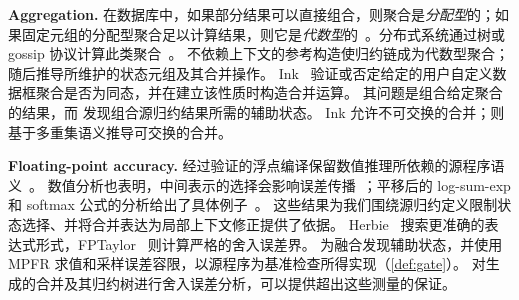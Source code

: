 \textbf{Aggregation.}
在数据库中，如果部分结果可以直接组合，则聚合是\emph{分配型}的；如果固定元组的分配型聚合足以计算结果，则它是\emph{代数型}的~\citep{datacube}。分布式系统通过树或 gossip 协议计算此类聚合~\citep{jesus}。
不依赖上下文的参考构造使归约链成为代数型聚合；\sys 随后推导所维护的状态元组及其合并操作。
Ink~\citep{ink} 验证或否定给定的用户自定义数据框聚合是否为同态，并在建立该性质时构造合并运算。
其问题是组合给定聚合的结果，而 \sys 发现组合源归约结果所需的辅助状态。
Ink 允许不可交换的合并；\sys 则基于多重集语义推导可交换的合并。

\textbf{Floating-point accuracy.}
经过验证的浮点编译保留数值推理所依赖的源程序语义~\citep{boldo_fp}。
数值分析也表明，中间表示的选择会影响误差传播~\citep{higham_decomposition}；平移后的 log-sum-exp 和 softmax 公式的分析给出了具体例子~\citep{blanchard}。
这些结果为我们围绕源归约定义限制状态选择、并将合并表达为局部上下文修正提供了依据。
Herbie~\citep{herbie} 搜索更准确的表达式形式，FPTaylor~\citep{fptaylor} 则计算严格的舍入误差界。
\sys 为融合发现辅助状态，并使用 MPFR 求值和采样误差容限，以源程序为基准检查所得实现（\cref{def:gate}）。
对生成的合并及其归约树进行舍入误差分析，可以提供超出这些测量的保证。
